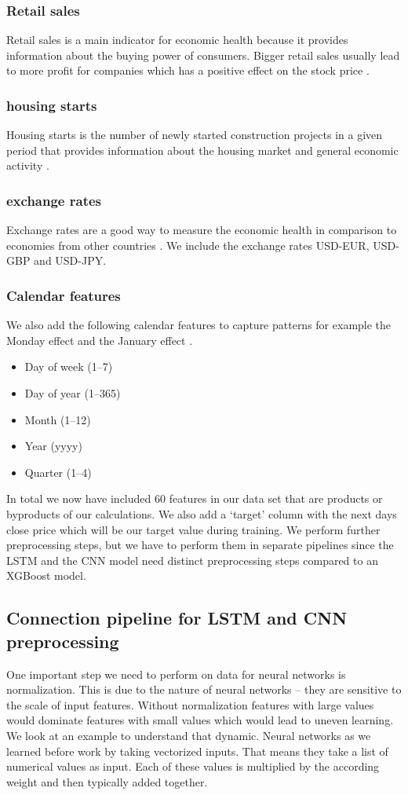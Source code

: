 \documentclass[a4paper,12pt]{report}
\begin{document}
			\subsubsection{Retail sales}
			Retail sales is a main indicator for economic health because it provides information about the buying power of consumers. Bigger retail sales usually lead to more profit for companies which has a positive effect on the stock price \cite{40}. 
			\subsubsection{housing starts}
			Housing starts is the number of newly started construction projects in a given period that provides information about the housing market and general economic activity \cite{45}. 
			\subsubsection{exchange rates}
Exchange rates are a good way to measure the economic health in comparison to economies from other countries \cite{46} \cite{47}. We include the exchange rates USD-EUR, USD-GBP and USD-JPY.
			\subsubsection{Calendar features}
We also add the following calendar features to capture patterns for example the Monday effect \cite{28} and the January effect \cite{29}.

\begin{itemize}
  \item Day of week (1--7)
  \item Day of year (1--365)
  \item Month (1--12)
  \item Year (yyyy)
  \item Quarter (1--4)
\end{itemize}


In total we now have included 60 features in our data set that are products or byproducts of our calculations. We also add a ‘target’ column with the next days close price which will be our target value during training. We perform further preprocessing steps, but we have to perform them in separate pipelines since the LSTM and the CNN model need distinct preprocessing steps compared to an XGBoost model. 


		\subsection{Connection pipeline for LSTM and CNN preprocessing}
One important step we need to perform on data for neural networks is normalization. This is due to the nature of neural networks – they are sensitive to the scale of input features. Without normalization features with large values would dominate features with small values which would lead to uneven learning. We look at an example to understand that dynamic. Neural networks as we learned before work by taking vectorized inputs. That means they take a list of numerical values as input. Each of these values is multiplied by the according weight and then typically added together. \\
\end{document}
